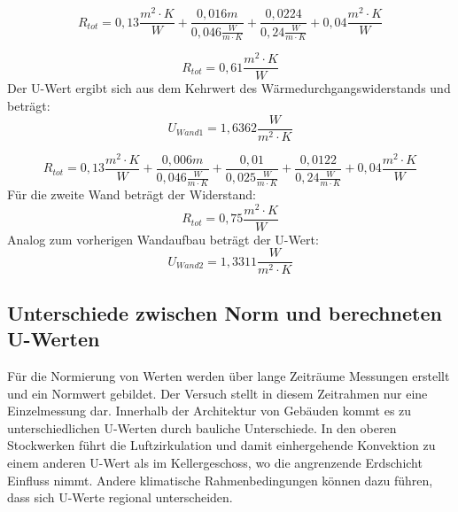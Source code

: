 $$R_{tot}=0,13 \frac{m^2 \cdot K}{W}+ \frac{0,016m}{0,046 \frac{W}{m \cdot K}}+\frac{0,0224}{0,24 \frac{W}{m \cdot K}} +0,04 \frac{m^2 \cdot K}{W}$$

$$R_{tot}=0,61\frac{m^2 \cdot K}{W}$$
Der U-Wert ergibt sich aus dem Kehrwert des Wärmedurchgangswiderstands und beträgt:
$$U_{Wand 1}=1,6362 \frac{W}{m^2 \cdot K}$$

$$R_{tot}=0,13\frac{m^2 \cdot K}{W}+ \frac{0,006m}{0,046\frac{W}{m\cdot K}}+ \frac{0,01}{0,025\frac{W}{m\cdot K}} +\frac{0,0122}{0,24\frac{W}{m\cdot K}} +0,04\frac{m^2 \cdot K}{W}$$
Für die zweite Wand beträgt der Widerstand:
$$R_{tot}=0,75\frac{m^2 \cdot K}{W}$$
Analog zum vorherigen Wandaufbau beträgt der U-Wert:
$$U_{Wand 2}=1,3311 \frac{W}{m^2 \cdot K}$$



\subsection{Unterschiede zwischen Norm und berechneten U-Werten}
Für die Normierung von Werten werden über lange Zeiträume Messungen erstellt und ein Normwert gebildet.
Der Versuch stellt in diesem Zeitrahmen nur eine Einzelmessung dar. 
Innerhalb der Architektur von Gebäuden kommt es zu unterschiedlichen U-Werten durch bauliche Unterschiede.
In den oberen Stockwerken führt die Luftzirkulation und damit einhergehende Konvektion zu einem anderen U-Wert als im Kellergeschoss, wo die angrenzende Erdschicht Einfluss nimmt.
Andere klimatische Rahmenbedingungen können dazu führen, dass sich U-Werte regional unterscheiden. 
